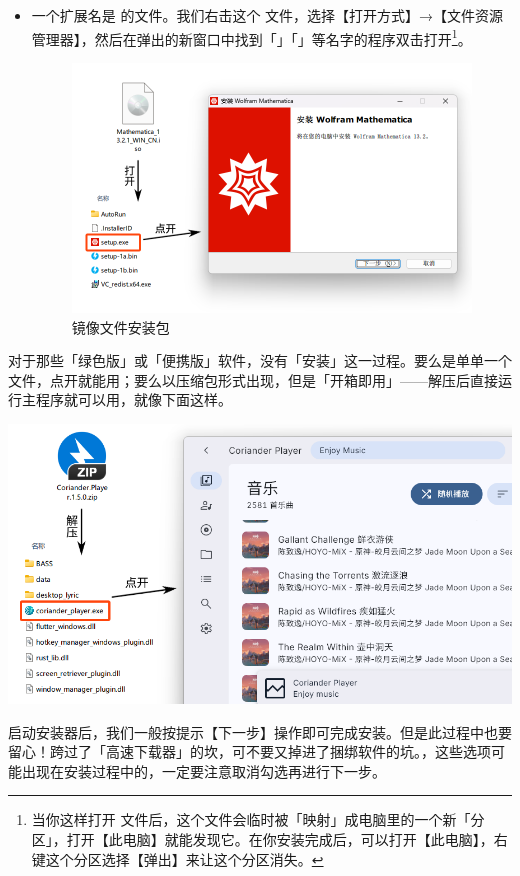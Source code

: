 \begin{itemize}
  \item 一个扩展名是  的文件。我们右击这个  文件，选择【打开方式】→【文件资源管理器】，然后在弹出的新窗口中找到「」「」等名字的程序双击打开\footnote{当你这样打开  文件后，这个文件会临时被「映射」成电脑里的一个新「分区」，打开【此电脑】就能发现它。在你安装完成后，可以打开【此电脑】，右键这个分区选择【弹出】来让这个分区消失。}。
    \begin{figure}[htb!]
      \centering
      \includegraphics[width=.6\textwidth]{assets/basic/Image_Installer.png}
      \caption{镜像文件安装包}
      \label{fig:Image_Installer}
    \end{figure}
\end{itemize}

\begin{note}
  对于那些「绿色版」或「便携版」软件，没有「安装」这一过程。要么是单单一个  文件，点开就能用；要么以压缩包形式出现，但是「开箱即用」——解压后直接运行主程序就可以用，就像下面这样。
  \begin{center}
    \includegraphics[width=.7\textwidth]{assets/basic/Portable_app.png}
    \label{fig:Portable_app}
  \end{center}
\end{note}

启动安装器后，我们一般按提示【下一步】操作即可完成安装。但是此过程中也要留心！跨过了「高速下载器」的坎，可不要又掉进了捆绑软件的坑。，这些选项可能出现在安装过程中的，一定要注意取消勾选再进行下一步。

